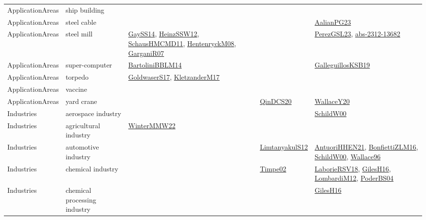 {\begin{longtable}{lp{3cm}>{\raggedright}p{6cm}>{\raggedright}p{6cm}p{8cm}}
ApplicationAreas & ship building &  &  & \\
ApplicationAreas & steel cable &  &  & \href{papers/AalianPG23.pdf}{AalianPG23}\cite{AalianPG23}\\
ApplicationAreas & steel mill & \href{papers/GaySS14.pdf}{GaySS14}\cite{GaySS14}, \href{articles/HeinzSSW12.pdf}{HeinzSSW12}\cite{HeinzSSW12}, \href{articles/SchausHMCMD11.pdf}{SchausHMCMD11}\cite{SchausHMCMD11}, \href{papers/HentenryckM08.pdf}{HentenryckM08}\cite{HentenryckM08}, \href{papers/GarganiR07.pdf}{GarganiR07}\cite{GarganiR07} &  & \href{papers/PerezGSL23.pdf}{PerezGSL23}\cite{PerezGSL23}, \href{articles/abs-2312-13682.pdf}{abs-2312-13682}\cite{abs-2312-13682}\\
ApplicationAreas & super-computer & \href{papers/BartoliniBBLM14.pdf}{BartoliniBBLM14}\cite{BartoliniBBLM14} &  & \href{papers/GalleguillosKSB19.pdf}{GalleguillosKSB19}\cite{GalleguillosKSB19}\\
ApplicationAreas & torpedo & \href{papers/GoldwaserS17.pdf}{GoldwaserS17}\cite{GoldwaserS17}, \href{papers/KletzanderM17.pdf}{KletzanderM17}\cite{KletzanderM17} &  & \\
ApplicationAreas & vaccine &  &  & \\
ApplicationAreas & yard crane &  & \href{articles/QinDCS20.pdf}{QinDCS20}\cite{QinDCS20} & \href{articles/WallaceY20.pdf}{WallaceY20}\cite{WallaceY20}\\
Industries & aerospace industry &  &  & \href{articles/SchildW00.pdf}{SchildW00}\cite{SchildW00}\\
Industries & agricultural industry & \href{papers/WinterMMW22.pdf}{WinterMMW22}\cite{WinterMMW22} &  & \\
Industries & automotive industry &  & \href{articles/LimtanyakulS12.pdf}{LimtanyakulS12}\cite{LimtanyakulS12} & \href{papers/AntuoriHHEN21.pdf}{AntuoriHHEN21}\cite{AntuoriHHEN21}, \href{papers/BonfiettiZLM16.pdf}{BonfiettiZLM16}\cite{BonfiettiZLM16}, \href{articles/SchildW00.pdf}{SchildW00}\cite{SchildW00}, \href{articles/Wallace96.pdf}{Wallace96}\cite{Wallace96}\\
Industries & chemical industry &  & \href{articles/Timpe02.pdf}{Timpe02}\cite{Timpe02} & \href{articles/LaborieRSV18.pdf}{LaborieRSV18}\cite{LaborieRSV18}, \href{papers/GilesH16.pdf}{GilesH16}\cite{GilesH16}, \href{articles/LombardiM12.pdf}{LombardiM12}\cite{LombardiM12}, \href{articles/PoderBS04.pdf}{PoderBS04}\cite{PoderBS04}\\
Industries & chemical processing industry &  &  & \href{papers/GilesH16.pdf}{GilesH16}\cite{GilesH16}\\

\end{longtable}}

